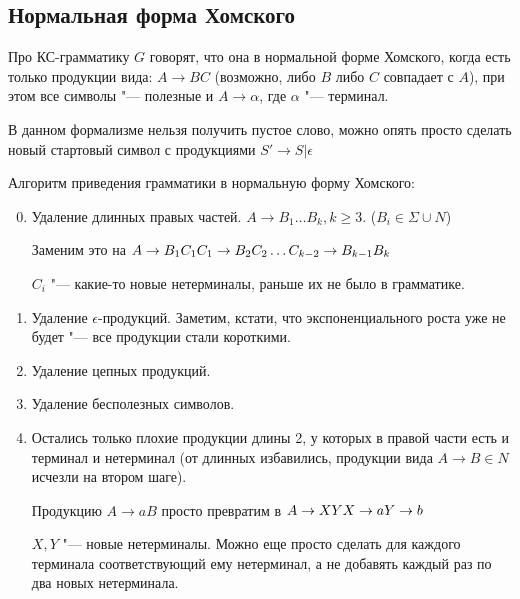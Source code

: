\subsection{Нормальная форма Хомского}
\begin{Def}
Про КС-грамматику $G$ говорят, что она в нормальной форме Хомского, когда есть только продукции вида: $A \to BC$ (возможно, либо $B$ либо $C$ совпадает с $A$), при этом все символы "--- полезные и $A \to \alpha$, где $\alpha$ "--- терминал.
\end{Def}
\begin{Rem}
В данном формализме нельзя получить пустое слово, можно опять просто сделать новый стартовый символ с продукциями $S' \to S | \epsilon$
\end{Rem}                                                                                                                              

Алгоритм приведения грамматики в нормальную форму Хомского:

\begin{enumerate}
\setcounter{enumi}{-1}
\item
Удаление длинных правых частей.
$A \to B_1 \dots B_k, k \geq 3$. ($B_i \in \Sigma \cup N$) 

Заменим это на $\\
A \to B_1C_1 \\
C_1 \to B_2C_2 \\
\dots \\
C_{k-2} \to B_{k-1}B_k$
                                      
$C_i$ "--- какие-то новые нетерминалы, раньше их не было в грамматике.

\item
Удаление $\epsilon$-продукций. Заметим, кстати, что экспоненциального роста уже не будет "--- все продукции стали короткими.

\item
Удаление цепных продукций.

\item
Удаление бесполезных символов.

\item
Остались только плохие продукции длины 2, у которых в правой части есть и терминал и нетерминал (от длинных избавились, продукции вида $A \to B \in N$ исчезли на втором шаге).

Продукцию $A \to aB$ просто превратим в $\\
A \to XY \\
X \to a \\
Y \to b
$

$X, Y$ "--- новые нетерминалы.
Можно еще просто сделать для каждого терминала соответствующий ему нетерминал, а не добавять каждый раз по два новых нетерминала.
\end{enumerate}                        

